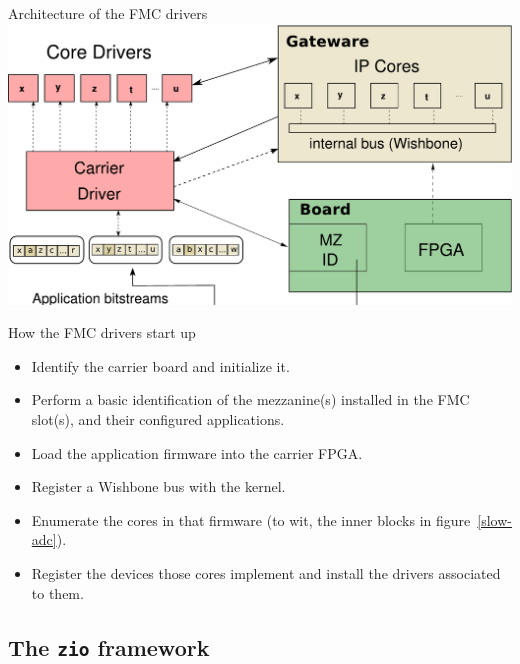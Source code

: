 \documentclass[compress,red]{beamer}
\begin{document}
\begin{frame}{Architecture of the FMC drivers}
\includegraphics[height=0.8\textheight]{driverarch.pdf}
\end{frame}

\begin{frame}{How the FMC drivers start up}
\begin{itemize}
\item Identify the carrier board and initialize it.
\item Perform a basic identification of the mezzanine(s) installed in
    the FMC slot(s), and their configured applications.
\item Load the application firmware into the carrier FPGA.
\item Register a Wishbone bus with the kernel.
\item Enumerate the cores in that firmware (to wit, the
    inner blocks in figure~\ref{slow-adc}).
\item Register the devices those cores implement and install the drivers
    associated to them.
\end{itemize}
\end{frame}



\subsection{The \texttt{zio} framework}
\end{document}
